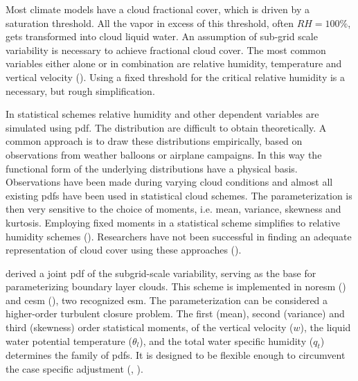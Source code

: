 Most climate models have a cloud fractional cover, which is driven by a saturation threshold. All the vapor in excess of this threshold, often $RH=100\%$, gets transformed into cloud liquid water. An assumption of sub-grid scale variability is necessary to achieve fractional cloud cover. %
The most common variables either alone or in combination are relative humidity, temperature and vertical velocity (\cite{Golaz2002_part1}). 
Using a fixed threshold for the critical relative humidity is a necessary, but rough simplification.

In statistical schemes relative humidity and other dependent variables are simulated using \acrfull{pdf}. The distribution are difficult to obtain theoretically. A common approach is to draw these distributions empirically, based on observations from weather balloons or airplane campaigns. In this way the functional form of the underlying distributions have a physical basis. Observations have been made during varying cloud conditions and almost all existing \acrshort{pdf}s have been used in statistical cloud schemes. The parameterization is then very sensitive to the choice of moments, i.e. mean, variance, skewness and kurtosis. Employing fixed moments in a statistical scheme simplifies to relative humidity schemes (\cite{Tomkins2005}). Researchers have not been successful in finding an adequate representation of cloud cover using these approaches (\cite{Tompkins2009CloudParametrization}). 

 derived a joint \acrshort{pdf} of the subgrid-scale variability, serving as the base for parameterizing boundary layer clouds. This scheme is implemented in \acrfull{noresm} (\cite{SelandNORESM}) and \acrfull{cesm} (\cite{DanabasogluCESM}), two recognized \acrshort{esm}. The parameterization can be considered a higher-order turbulent closure problem. The first (mean), second (variance) and third (skewness) order statistical moments, of the vertical velocity ($w$), the liquid water potential temperature ($\theta_l$), and the total water specific humidity ($q_t$) determines the family of \acrshort{pdf}s. It is designed to be flexible enough to 
circumvent the case specific adjustment (\cite{Golaz2002_part1}, \cite{Golaz2002_part2}). 

